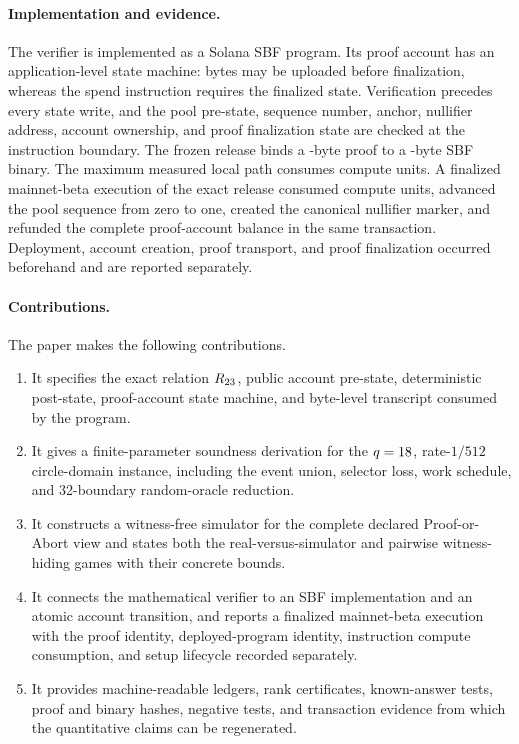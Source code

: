 \paragraph{Implementation and evidence.}
The verifier is implemented as a Solana SBF program.  Its proof account has an
application-level state machine: bytes may be uploaded before finalization,
whereas the spend instruction requires the finalized state.  Verification
precedes every state write, and the pool pre-state, sequence number, anchor,
nullifier address, account ownership, and proof finalization state are checked
at the instruction boundary.  The frozen release binds a
\ProfileProofBytes-byte proof to a \ProfileSbfBytes-byte SBF binary.  The
maximum measured local path consumes \ProfileComputeUnits{} compute units.  A
finalized mainnet-beta execution of the exact release consumed
\ProfileMainnetComputeUnits{} compute units, advanced the pool sequence from
zero to one, created the canonical nullifier marker, and refunded the complete
proof-account balance in the same transaction.  Deployment, account creation,
proof transport, and proof finalization occurred beforehand and are reported
separately.

\paragraph{Contributions.}
The paper makes the following contributions.

\begin{enumerate}[leftmargin=*,itemsep=0.45em]
  \item It specifies the exact relation $R_{23}$, public account pre-state,
  deterministic post-state, proof-account state machine, and byte-level
  transcript consumed by the program.

  \item It gives a finite-parameter soundness derivation for the
  $q=18$, rate-$1/512$ circle-domain instance, including the
  event union, selector loss, work schedule, and 32-boundary random-oracle
  reduction.

  \item It constructs a witness-free simulator for the complete declared
  Proof-or-Abort view and states both the real-versus-simulator and pairwise
  witness-hiding games with their concrete bounds.

  \item It connects the mathematical verifier to an SBF implementation and an
  atomic account transition, and reports a finalized mainnet-beta execution
  with the proof identity, deployed-program identity, instruction compute
  consumption, and setup lifecycle recorded separately.

  \item It provides machine-readable ledgers, rank certificates, known-answer
  tests, proof and binary hashes, negative tests, and transaction evidence from
  which the quantitative claims can be regenerated.
\end{enumerate}

